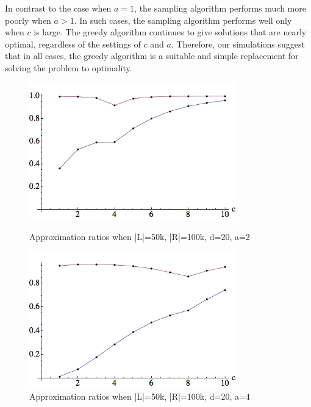 In contrast to the case when $a=1$, the sampling algorithm performs much more poorly when $a>1$. In such cases, the sampling algorithm performs well only when $c$ is large. The greedy algorithm continues to give solutions that are nearly optimal, regardless of the settings of $c$ and $a$. Therefore, our simulations suggest that in all cases, the greedy algorithm is a suitable and simple replacement for solving the problem to optimality.

\begin{figure}[h]
\centering
\begin{minipage}[h]{0.45\textwidth}
\centering
\includegraphics[width=0.8\textwidth]{images/l=50000,r=100000,a=2_Greedy_vs_Naive.png}
\caption{Approximation ratios when |L|=50k, |R|=100k, d=20, a=2}
\end{minipage}
\hspace{0.2cm}
\begin{minipage}[h]{0.45\textwidth}
\centering
\includegraphics[width=0.8\textwidth]{images/l=50000,r=100000,a=4_Greedy_vs_Naive.png}
\caption{Approximation ratios when |L|=50k, |R|=100k, d=20, a=4}
\end{minipage}
\end{figure}